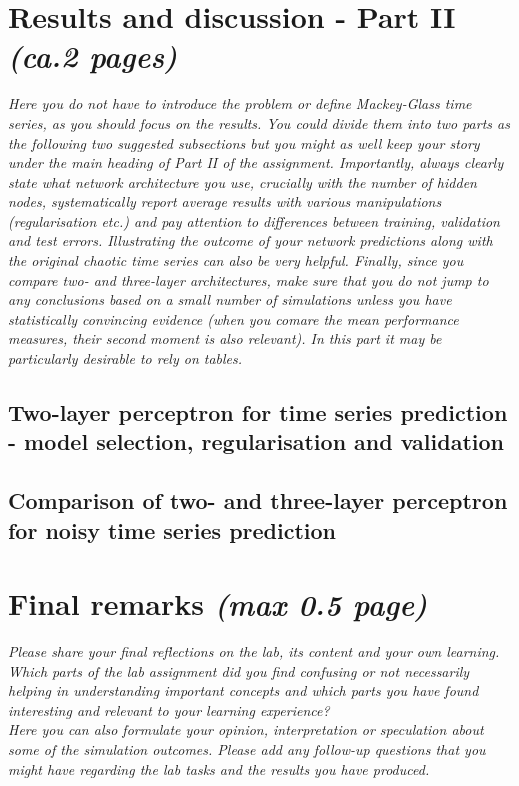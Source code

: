 \documentclass[a4paper]{article}
\begin{document}
\section{Results and discussion - Part II \textit{(ca.2 pages)}}

\textit{Here you do not have to introduce the problem or define Mackey-Glass time series, as you should focus on the results. You could divide them into two parts as the following two suggested subsections but you might as well keep your story under the main heading of Part II of the assignment. Importantly, always clearly state what network architecture you use, crucially with the number of hidden nodes, systematically report average results with various manipulations (regularisation etc.) and pay attention to differences between training, validation and test errors. Illustrating the outcome of your network predictions along with the original chaotic time series can also be very helpful. Finally, since you compare two- and three-layer architectures, make sure that you do not jump to any conclusions based on a small number of simulations unless you have statistically convincing evidence (when you comare the mean performance measures, their second moment is also relevant). In this part it may be particularly desirable to rely on tables.}

\subsection{Two-layer perceptron for time series prediction - model selection, regularisation and validation}

\subsection{Comparison of two- and three-layer perceptron for noisy time series prediction}

\section{Final remarks \normalsize{\textit{(max 0.5 page)}}}
\textit{Please share your final reflections on the lab, its content and your own learning. Which parts of the lab assignment did you find confusing or not necessarily helping in understanding important concepts and which parts you have found interesting and relevant to your learning experience? \\
Here you can also formulate your opinion, interpretation or speculation about some of the simulation outcomes. Please add any follow-up questions that you might have regarding the lab tasks and the results you have produced.}
\end{document}
